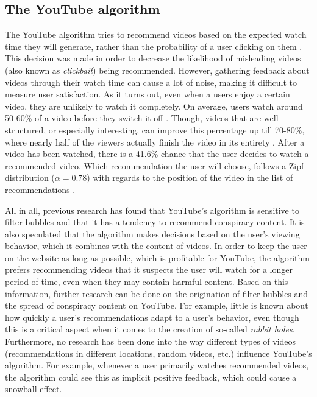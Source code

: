 \documentclass[../main.tex]{subfiles}
\begin{document}
\subsection{The YouTube algorithm}
The YouTube algorithm tries to recommend videos based on the expected watch time they will generate,
rather than the probability of a user clicking on them \citep{covington2016deep}. This decision was made
in order to decrease the likelihood of misleading videos (also known as \textit{clickbait}) being
recommended. However, gathering feedback about videos through their watch time can cause a lot of noise,
making it difficult to measure user satisfaction. As it turns out, even when a users enjoy a certain
video, they are unlikely to watch it completely. On average, users watch around 50-60\% of a video
before they switch it off \citep{park2016data}. Though, videos that are well-structured, or especially
interesting, can improve this percentage up till 70-80\%, where nearly half of the viewers actually
finish the video in its entirety \citep{lang_2018}. After a video has been watched, there is a 41.6\%
chance that the user decides to watch a recommended video. Which recommendation the user will choose,
follows a Zipf-distribution ($\alpha = 0.78$) with regards to the position of the video in the list of
recommendations \citep{zhou2010impact}. 

All in all, previous research has found that YouTube's algorithm is sensitive to filter bubbles and that
it has a tendency to recommend conspiracy content. It is also speculated that the algorithm makes
decisions based on the user's viewing behavior, which it combines with the content of videos. In order
to keep the user on the website as long as possible, which is profitable for YouTube, the algorithm
prefers recommending videos that it suspects the user will watch for a longer period of time, even when
they may contain harmful content. Based on this information, further research can be done on the
origination of filter bubbles and the spread of conspiracy content on YouTube. For example, little is
known about how quickly a user's recommendations adapt to a user's behavior, even though this is a
critical aspect when it comes to the creation of so-called \textit{rabbit holes}. Furthermore, no
research has been done into the way different types of videos (recommendations in different locations,
random videos, etc.) influence YouTube's algorithm. For example, whenever a user primarily watches
recommended videos, the algorithm could see this as implicit positive feedback, which could cause a
snowball-effect. 
\end{document}
